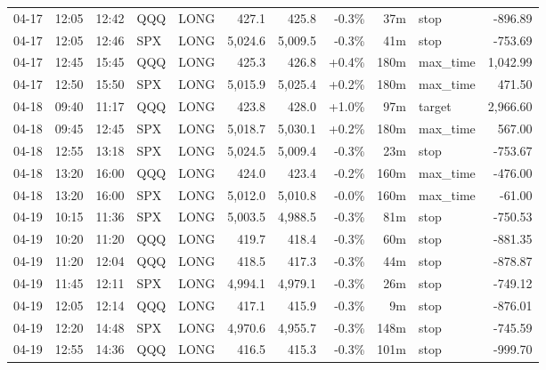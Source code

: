 \documentclass[11pt,a4paper,twoside]{article}
\begin{document}
\begin{center}
\begin{longtable}{>{\color{txtmain}}l l l l l r r r r >{\color{txtmain}}l r}
04-17 & 12:05 & 12:42 & QQQ & LONG & 427.1 & 425.8 & \textcolor{lossred}{-0.3\%} & 37m & stop & \textcolor{lossred}{-896.89} \\
04-17 & 12:05 & 12:46 & SPX & LONG & 5,024.6 & 5,009.5 & \textcolor{lossred}{-0.3\%} & 41m & stop & \textcolor{lossred}{-753.69} \\
04-17 & 12:45 & 15:45 & QQQ & LONG & 425.3 & 426.8 & \textcolor{wingreen}{+0.4\%} & 180m & max\_time & \textcolor{wingreen}{1,042.99} \\
04-17 & 12:50 & 15:50 & SPX & LONG & 5,015.9 & 5,025.4 & \textcolor{wingreen}{+0.2\%} & 180m & max\_time & \textcolor{wingreen}{471.50} \\
04-18 & 09:40 & 11:17 & QQQ & LONG & 423.8 & 428.0 & \textcolor{wingreen}{+1.0\%} & 97m & target & \textcolor{wingreen}{2,966.60} \\
04-18 & 09:45 & 12:45 & SPX & LONG & 5,018.7 & 5,030.1 & \textcolor{wingreen}{+0.2\%} & 180m & max\_time & \textcolor{wingreen}{567.00} \\
04-18 & 12:55 & 13:18 & SPX & LONG & 5,024.5 & 5,009.4 & \textcolor{lossred}{-0.3\%} & 23m & stop & \textcolor{lossred}{-753.67} \\
04-18 & 13:20 & 16:00 & QQQ & LONG & 424.0 & 423.4 & \textcolor{lossred}{-0.2\%} & 160m & max\_time & \textcolor{lossred}{-476.00} \\
04-18 & 13:20 & 16:00 & SPX & LONG & 5,012.0 & 5,010.8 & \textcolor{lossred}{-0.0\%} & 160m & max\_time & \textcolor{lossred}{-61.00} \\
04-19 & 10:15 & 11:36 & SPX & LONG & 5,003.5 & 4,988.5 & \textcolor{lossred}{-0.3\%} & 81m & stop & \textcolor{lossred}{-750.53} \\
04-19 & 10:20 & 11:20 & QQQ & LONG & 419.7 & 418.4 & \textcolor{lossred}{-0.3\%} & 60m & stop & \textcolor{lossred}{-881.35} \\
04-19 & 11:20 & 12:04 & QQQ & LONG & 418.5 & 417.3 & \textcolor{lossred}{-0.3\%} & 44m & stop & \textcolor{lossred}{-878.87} \\
04-19 & 11:45 & 12:11 & SPX & LONG & 4,994.1 & 4,979.1 & \textcolor{lossred}{-0.3\%} & 26m & stop & \textcolor{lossred}{-749.12} \\
04-19 & 12:05 & 12:14 & QQQ & LONG & 417.1 & 415.9 & \textcolor{lossred}{-0.3\%} & 9m & stop & \textcolor{lossred}{-876.01} \\
04-19 & 12:20 & 14:48 & SPX & LONG & 4,970.6 & 4,955.7 & \textcolor{lossred}{-0.3\%} & 148m & stop & \textcolor{lossred}{-745.59} \\
04-19 & 12:55 & 14:36 & QQQ & LONG & 416.5 & 415.3 & \textcolor{lossred}{-0.3\%} & 101m & stop & \textcolor{lossred}{-999.70} \\

\end{longtable}
\end{center}
\end{document}
